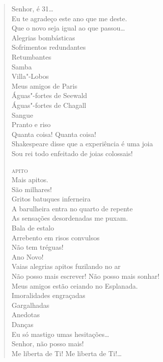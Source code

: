 \begin{verse}
Senhor, é 31\ldots{}\\
Eu te agradeço este ano que me deste.\\
Que o novo seja igual ao que passou\ldots{}\\
\qquad\qquad\qquad\qquad\quad Alegrias bombásticas\\
\qquad\qquad\qquad\qquad\quad Sofrimentos redundantes\\
\qquad\qquad\qquad\qquad\qquad\qquad\quad Retumbantes\\
\qquad\qquad\qquad\qquad\qquad\quad Samba\\
\qquad\qquad\qquad\qquad\qquad Villa"-Lobos\\
\qquad\qquad\qquad\qquad\quad Meus amigos de Paris\\
\qquad\qquad Águas"-fortes de Seewald\\
\qquad\qquad Águas"-fortes de Chagall\\
\qquad\qquad\qquad\qquad\qquad Sangue\\
\qquad\qquad\qquad\qquad\quad Pranto e riso\\
\qquad\qquad\quad Quanta coisa! Quanta coisa!\\
Shakespeare disse que a experiência é uma joia\\
Sou rei todo enfeitado de joias colossais!

\qquad\qquad \textsc{apito}\\
\qquad Mais apitos.\\
\qquad São milhares!\\
Gritos batuques inferneira\\
A barulheira entra no quarto de repente\\
As sensações desordenadas me puxam.\\
\qquad\qquad\qquad Bala de estalo\\
\qquad\qquad Arrebento em risos convulsos\\
\qquad\qquad Não tem tréguas!\\
\qquad Ano Novo!\\
Vaias alegrias apitos fuzilando no ar\\
Não posso mais escrever! Não posso mais sonhar!\\
Meus amigos estão ceiando no Esplanada.\\
\qquad\qquad Imoralidades engraçadas\\
\qquad\qquad Gargalhadas\\
\qquad\qquad Anedotas\\
\qquad\qquad Danças\\
Eu só mastigo umas hesitações\ldots{}\\
Senhor, não posso mais!\\
Me liberta de Ti! Me liberta de Ti!\ldots{}


\end{verse}
